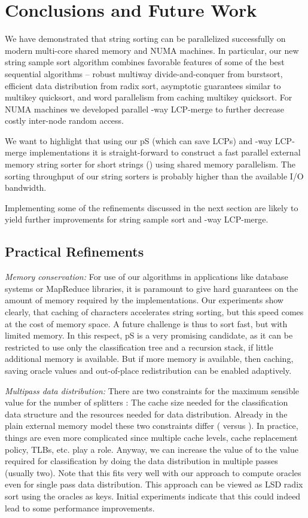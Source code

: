 \documentclass[a4paper]{myjournal}
\begin{document}
\FloatBarrier

\section{Conclusions and Future Work}\label{sec:conclusions}

We have demonstrated that string sorting can be parallelized successfully on
modern multi-core shared memory and NUMA machines. In particular, our new string
sample sort algorithm combines favorable features of some of the best sequential
algorithms -- robust multiway divide-and-conquer from burstsort, efficient data
distribution from radix sort, asymptotic guarantees similar to multikey
quicksort, and word parallelism from caching multikey quicksort.  For NUMA
machines we developed parallel -way LCP-merge to further decrease costly
inter-node random access.

We want to highlight that using our pS (which can save LCPs) and -way
LCP-merge implementations it is straight-forward to construct a fast parallel
external memory string sorter for short strings () using shared memory
parallelism. The sorting throughput of our string sorters is probably higher
than the available I/O bandwidth.

Implementing some of the refinements discussed in the next section are likely to
yield further improvements for string sample sort and -way
LCP-merge.

\subsection{Practical Refinements}\label{app:refinements}

\emph{Memory conservation:} For use of our algorithms in applications like
database systems or MapReduce libraries, it is paramount to give hard guarantees
on the amount of memory required by the implementations. Our experiments show
clearly, that caching of characters accelerates string sorting, but this speed
comes at the cost of memory space. A future challenge is thus to sort fast, but
with limited memory. In this respect, pS is a very promising candidate, as
it can be restricted to use only the classification tree and a recursion stack,
if little additional memory is available. But if more memory is available, then
caching, saving oracle values and out-of-place redistribution can be enabled
adaptively.

\emph{Multipass data distribution:} There are two constraints for the maximum
sensible value for the number of splitters : The cache size needed for the
classification data structure and the resources needed for data
distribution. Already in the plain external memory model these two constraints
differ ( versus ). In practice, things are even more
complicated since multiple cache levels, cache replacement policy, TLBs,
etc. play a role. Anyway, we can increase the value of  to the value required
for classification by doing the data distribution in multiple passes (usually
two).  Note that this fits very well with our approach to compute oracles even
for single pass data distribution. This approach can be viewed as LSD radix sort
using the oracles as keys. Initial experiments indicate that this could indeed
lead to some performance improvements.
\end{document}
